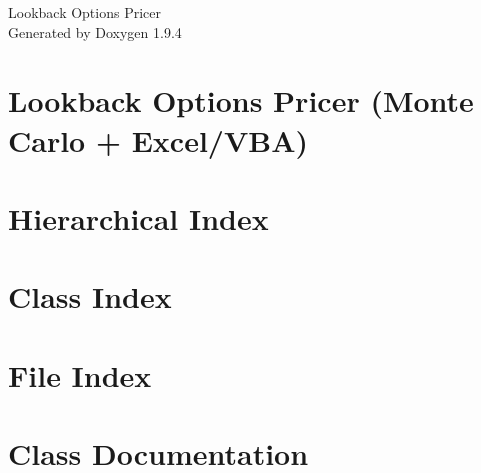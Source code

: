\documentclass[twoside]{book}
\newcommand{\+}{\discretionary{\mbox{\scriptsize$\hookleftarrow$}}{}{}}
\newcommand{\clearemptydoublepage}{%
    \newpage{\pagestyle{empty}\cleardoublepage}%
  }
\begin{document}
  \raggedbottom
    \hypersetup{pageanchor=false,
                bookmarksnumbered=true,
                pdfencoding=unicode
               }
  \begin{titlepage}
  \vspace*{7cm}
  \begin{center}%
  {\Large Lookback Options Pricer}\\
  \vspace*{1cm}
  {\large Generated by Doxygen 1.9.4}\\
  \end{center}
  \end{titlepage}
  \clearemptydoublepage
  \tableofcontents
  \clearemptydoublepage
  \hypersetup{pageanchor=true}
\chapter{Lookback Options Pricer (Monte Carlo + Excel/\+VBA)}
\label{index}\hypertarget{index}{}
\chapter{Hierarchical Index}

\chapter{Class Index}

\chapter{File Index}

\chapter{Class Documentation}
















\end{document}
